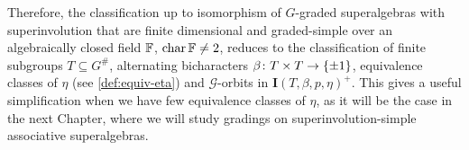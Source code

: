
Therefore, the classification up to isomorphism of $G$-graded superalgebras with superinvolution that are finite dimensional and graded-simple over an algebraically closed field $\mathbb{F}$, $\operatorname{char} \mathbb{F} \neq 2$, reduces to the classification of finite subgroups $T\subseteq G^\#$, alternating bicharacters $\beta\colon T\times T \to \{ \pm 1 \}$, equivalence classes of $\eta$ (see \cref{def:equiv-eta}) and $\mathcal G$-orbits in $\mathbf{I}(T,\beta, p, \eta)^+$.
This gives a useful simplification when we have few equivalence classes of $\eta$, as it will be the case in the next Chapter, where we will study gradings on superinvolution-simple associative superalgebras. 

